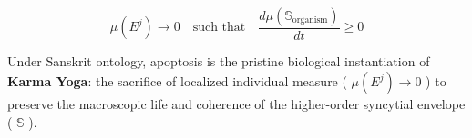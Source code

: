 \documentclass[11pt,a4paper]{article}
\theoremstyle{definition}
\theoremstyle{remark}
\begin{document}
\begin{equation}
\mu(E^j) \longrightarrow 0 \quad \text{such that} \quad \frac{d\mu(\mathbb{S}_{\text{organism}})}{dt} \ge 0
\end{equation}


Under Sanskrit ontology, apoptosis is the pristine biological instantiation of \textbf{Karma Yoga}: the sacrifice of localized individual measure ( $\mu(E^j) \to 0$ ) to preserve the macroscopic life and coherence of the higher-order syncytial envelope ( $\mathbb{S}$ ).
\end{document}
